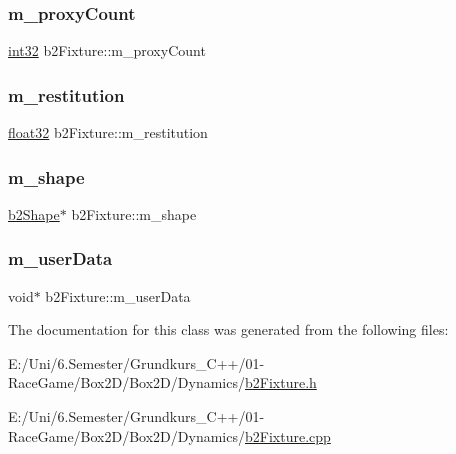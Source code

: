 \mbox{\label{classb2_fixture_aae71b4a0071346aba2eb6f4a764785a4}} 
\subsubsection{\texorpdfstring{m\_proxyCount}{m\_proxyCount}}
{\footnotesize\ttfamily \mbox{\hyperlink{b2_settings_8h_a43d43196463bde49cb067f5c20ab8481}{int32}} b2\+Fixture\+::m\+\_\+proxy\+Count\hspace{0.3cm}{\ttfamily [protected]}}

\mbox{\label{classb2_fixture_a343a35683ce4a79d2151761611027d66}} 
\subsubsection{\texorpdfstring{m\_restitution}{m\_restitution}}
{\footnotesize\ttfamily \mbox{\hyperlink{b2_settings_8h_aacdc525d6f7bddb3ae95d5c311bd06a1}{float32}} b2\+Fixture\+::m\+\_\+restitution\hspace{0.3cm}{\ttfamily [protected]}}

\mbox{\label{classb2_fixture_a54fa48dfc8b70a435c8f17f8b7720828}} 
\subsubsection{\texorpdfstring{m\_shape}{m\_shape}}
{\footnotesize\ttfamily \mbox{\hyperlink{classb2_shape}{b2\+Shape}}$\ast$ b2\+Fixture\+::m\+\_\+shape\hspace{0.3cm}{\ttfamily [protected]}}

\mbox{\label{classb2_fixture_a60191e5c76bfd115e6c38d78b6cffd8b}} 
\subsubsection{\texorpdfstring{m\_userData}{m\_userData}}
{\footnotesize\ttfamily void$\ast$ b2\+Fixture\+::m\+\_\+user\+Data\hspace{0.3cm}{\ttfamily [protected]}}



The documentation for this class was generated from the following files\+:\begin{DoxyCompactItemize}
\item 
E\+:/\+Uni/6.\+Semester/\+Grundkurs\+\_\+\+C++/01-\/\+Race\+Game/\+Box2\+D/\+Box2\+D/\+Dynamics/\mbox{\hyperlink{b2_fixture_8h}{b2\+Fixture.\+h}}\item 
E\+:/\+Uni/6.\+Semester/\+Grundkurs\+\_\+\+C++/01-\/\+Race\+Game/\+Box2\+D/\+Box2\+D/\+Dynamics/\mbox{\hyperlink{b2_fixture_8cpp}{b2\+Fixture.\+cpp}}\end{DoxyCompactItemize}
